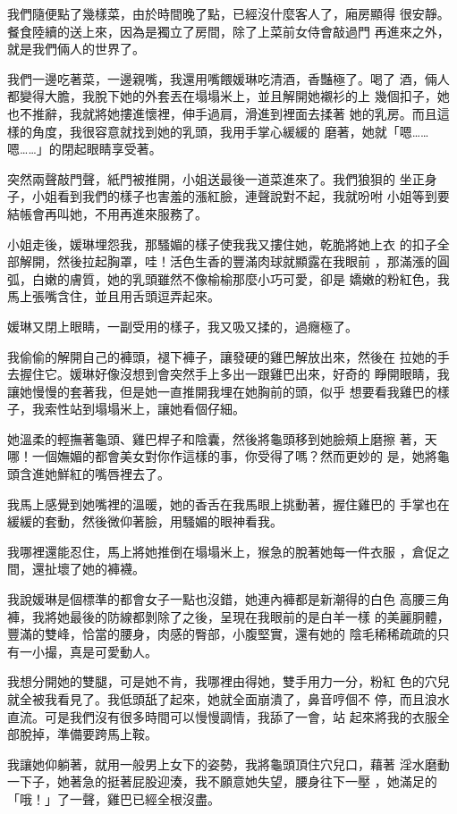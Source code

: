 我們隨便點了幾樣菜，由於時間晚了點，已經沒什麼客人了，廂房顯得
很安靜。餐食陸續的送上來，因為是獨立了房間，除了上菜前女侍會敲過門
再進來之外，就是我們倆人的世界了。

我們一邊吃著菜，一邊親嘴，我還用嘴餵媛琳吃清酒，香豔極了。喝了
酒，倆人都變得大膽，我脫下她的外套丟在塌塌米上，並且解開她襯衫的上
幾個扣子，她也不推辭，我就將她摟進懷裡，伸手過肩，滑進到裡面去揉著
她的乳房。而且這樣的角度，我很容意就找到她的乳頭，我用手掌心緩緩的
磨著，她就「嗯……嗯……」的閉起眼睛享受著。

突然兩聲敲門聲，紙門被推開，小姐送最後一道菜進來了。我們狼狽的
坐正身子，小姐看到我們的樣子也害羞的漲紅臉，連聲說對不起，我就吩咐
小姐等到要結帳會再叫她，不用再進來服務了。

小姐走後，媛琳埋怨我，那騷媚的樣子使我我又摟住她，乾脆將她上衣
的扣子全部解開，然後拉起胸罩，哇！活色生香的豐滿肉球就顯露在我眼前
，那滿漲的圓弧，白嫩的膚質，她的乳頭雖然不像榆榆那麼小巧可愛，卻是
嬌嫩的粉紅色，我馬上張嘴含住，並且用舌頭逗弄起來。

媛琳又閉上眼睛，一副受用的樣子，我又吸又揉的，過癮極了。

我偷偷的解開自己的褲頭，褪下褲子，讓發硬的雞巴解放出來，然後在
拉她的手去握住它。媛琳好像沒想到會突然手上多出一跟雞巴出來，好奇的
睜開眼睛，我讓她慢慢的套著我，但是她一直推開我埋在她胸前的頭，似乎
想要看我雞巴的樣子，我索性站到塌塌米上，讓她看個仔細。

她溫柔的輕撫著龜頭、雞巴桿子和陰囊，然後將龜頭移到她臉頰上磨擦
著，天哪！一個嫵媚的都會美女對你作這樣的事，你受得了嗎？然而更妙的
是，她將龜頭含進她鮮紅的嘴唇裡去了。

我馬上感覺到她嘴裡的溫暖，她的香舌在我馬眼上挑動著，握住雞巴的
手掌也在緩緩的套動，然後微仰著臉，用騷媚的眼神看我。

我哪裡還能忍住，馬上將她推倒在塌塌米上，猴急的脫著她每一件衣服
，倉促之間，還扯壞了她的褲襪。

我說媛琳是個標準的都會女子一點也沒錯，她連內褲都是新潮得的白色
高腰三角褲，我將她最後的防線都剝除了之後，呈現在我眼前的是白羊一樣
的美麗胴體，豐滿的雙峰，恰當的腰身，肉感的臀部，小腹堅實，還有她的
陰毛稀稀疏疏的只有一小撮，真是可愛動人。

我想分開她的雙腿，可是她不肯，我哪裡由得她，雙手用力一分，粉紅
色的穴兒就全被我看見了。我低頭舐了起來，她就全面崩潰了，鼻音哼個不
停，而且浪水直流。可是我們沒有很多時間可以慢慢調情，我舔了一會，站
起來將我的衣服全部脫掉，準備要跨馬上鞍。

我讓她仰躺著，就用一般男上女下的姿勢，我將龜頭頂住穴兒口，藉著
淫水磨動一下子，她著急的挺著屁股迎湊，我不願意她失望，腰身往下一壓
，她滿足的「哦！」了一聲，雞巴已經全根沒盡。


